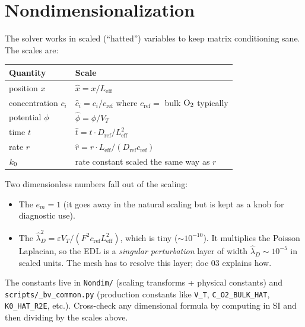 \documentclass[11pt]{article}
\begin{document}
\section{Nondimensionalization}

The solver works in scaled (``hatted'') variables to keep matrix
conditioning sane. The scales are:
\begin{center}
\begin{tabular}{ll}
\toprule
\textbf{Quantity} & \textbf{Scale} \\
\midrule
position $x$    & $\hat{x} = x/L_{\mathrm{eff}}$ \\
concentration $c_i$ & $\hat{c}_i = c_i / c_{\mathrm{ref}}$ where $c_{\mathrm{ref}} = $ bulk $\mathrm{O_2}$ typically\\
potential $\phi$    & $\hat{\phi} = \phi / V_T$ \\
time $t$        & $\hat{t} = t \cdot D_{\mathrm{ref}} / L_{\mathrm{eff}}^2$ \\
rate $r$        & $\hat{r} = r \cdot L_{\mathrm{eff}} / (D_{\mathrm{ref}} c_{\mathrm{ref}})$ \\
$k_0$        & rate constant scaled the same way as $r$ \\
\bottomrule
\end{tabular}
\end{center}

Two dimensionless numbers fall out of the scaling:
\begin{itemize}[leftmargin=*]
\item The  $e_m = 1$ (it goes
      away in the natural scaling but is kept as a knob for
      diagnostic use).
\item The 
      $\hat{\lambda}_D^2 = \varepsilon V_T / (F^2 c_{\mathrm{ref}}
      L_{\mathrm{eff}}^2)$, which is tiny ($\sim 10^{-10}$). It
      multiplies the Poisson Laplacian, so the EDL is a
      \emph{singular perturbation} layer of width
      $\hat{\lambda}_D \sim 10^{-5}$ in scaled units. The mesh has
      to resolve this layer; doc 03 explains how.
\end{itemize}

The constants live in \texttt{Nondim/} (scaling transforms +
physical constants) and \texttt{scripts/\_bv\_common.py} (production
constants like \texttt{V\_T}, \texttt{C\_O2\_BULK\_HAT},
\texttt{K0\_HAT\_R2E}, etc.). Cross-check any dimensional formula
by computing in SI and then dividing by the scales above.
\end{document}

